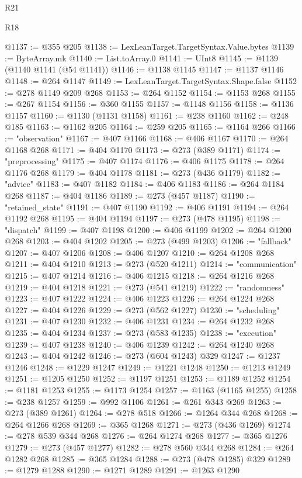 \begin{lexlean}{R21}
\begin{lexlean}{R18}
\begin{coremodule}
{{{{{{{{{{{{{{{{{{{{{{{{{{{{{{{{{{{{{{{{{{{{{{{{{{{{{{{{{{{{{{{{{{{{{{{{{{{{{{{{{{{{{{{{{{{{{{{{{{{{{{{{{{{{{{{{{{{{{{{{{{{{{{{{{{{{{{{{{{{{{{{@1137 := @355 @205
@1138 := LexLeanTarget.TargetSyntax.Value.bytes
@1139 := ByteArray.mk
@1140 := List.toArray.{0}
@1141 := UInt8
@1145 := @1139 (@1140 @1141 (@54 @1141))
@1146 := @1138 @1145
@1147 := @1137 @1146
@1148 := @264 @1147
@1149 := LexLeanTarget.TargetSyntax.Shape.false
@1152 := @278 @1149 @209 @268
@1153 := @264 @1152
@1154 := @1153 @268
@1155 := @267 @1154
@1156 := @360 @1155
@1157 := @1148 @1156
@1158 := @1136 @1157
@1160 := @1130 (@1131 @1158)
@1161 := @238 @1160
@1162 := @248 @185
@1163 := @1162 @205
@1164 := @259 @205
@1165 := @1164 @266
@1166 := "observation"
@1167 := @407 @1166
@1168 := @406 @1167
@1170 := @264 @1168 @268
@1171 := @404 @1170
@1173 := @273 (@389 @1171)
@1174 := "preprocessing"
@1175 := @407 @1174
@1176 := @406 @1175
@1178 := @264 @1176 @268
@1179 := @404 @1178
@1181 := @273 (@436 @1179)
@1182 := "advice"
@1183 := @407 @1182
@1184 := @406 @1183
@1186 := @264 @1184 @268
@1187 := @404 @1186
@1189 := @273 (@457 @1187)
@1190 := "retained_state"
@1191 := @407 @1190
@1192 := @406 @1191
@1194 := @264 @1192 @268
@1195 := @404 @1194
@1197 := @273 (@478 @1195)
@1198 := "dispatch"
@1199 := @407 @1198
@1200 := @406 @1199
@1202 := @264 @1200 @268
@1203 := @404 @1202
@1205 := @273 (@499 @1203)
@1206 := "fallback"
@1207 := @407 @1206
@1208 := @406 @1207
@1210 := @264 @1208 @268
@1211 := @404 @1210
@1213 := @273 (@520 @1211)
@1214 := "communication"
@1215 := @407 @1214
@1216 := @406 @1215
@1218 := @264 @1216 @268
@1219 := @404 @1218
@1221 := @273 (@541 @1219)
@1222 := "randomness"
@1223 := @407 @1222
@1224 := @406 @1223
@1226 := @264 @1224 @268
@1227 := @404 @1226
@1229 := @273 (@562 @1227)
@1230 := "scheduling"
@1231 := @407 @1230
@1232 := @406 @1231
@1234 := @264 @1232 @268
@1235 := @404 @1234
@1237 := @273 (@583 @1235)
@1238 := "execution"
@1239 := @407 @1238
@1240 := @406 @1239
@1242 := @264 @1240 @268
@1243 := @404 @1242
@1246 := @273 (@604 @1243) @329
@1247 := @1237 @1246
@1248 := @1229 @1247
@1249 := @1221 @1248
@1250 := @1213 @1249
@1251 := @1205 @1250
@1252 := @1197 @1251
@1253 := @1189 @1252
@1254 := @1181 @1253
@1255 := @1173 @1254
@1257 := @1163 (@1165 @1255)
@1258 := @238 @1257
@1259 := @992 @1106
@1261 := @261 @343 @269
@1263 := @273 (@389 @1261)
@1264 := @278 @518
@1266 := @1264 @344 @268
@1268 := @264 @1266 @268
@1269 := @365 @1268
@1271 := @273 (@436 @1269)
@1274 := @278 @539 @344 @268
@1276 := @264 @1274 @268
@1277 := @365 @1276
@1279 := @273 (@457 @1277)
@1282 := @278 @560 @344 @268
@1284 := @264 @1282 @268
@1285 := @365 @1284
@1288 := @273 (@478 @1285) @329
@1289 := @1279 @1288
@1290 := @1271 @1289
@1291 := @1263 @1290
}}}}}}}}}}}}}}}}}}}}}}}}}}}}}}}}}}}}}}}}}}}}}}}}}}}}}}}}}}}}}}}}}}}}}}}}}}}}}}}}}}}}}}}}}}}}}}}}}}}}}}}}}}}}}}}}}}}}}}}}}}}}}}}}}}}}}}}}}}}}}}}
\end{coremodule}
\end{lexlean}
\end{lexlean}
